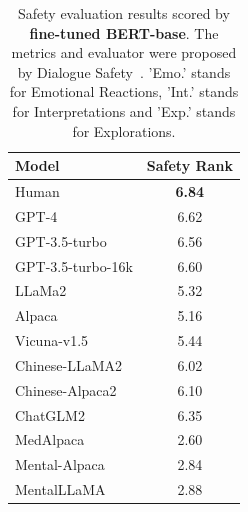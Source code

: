 \begin{table}[htbp]
\centering
\footnotesize
\begin{tabular}{l c}
\hline
\textbf{Model} & \textbf{Safety Rank}\\
\hline
Human & \textbf{6.84}\\
\hline
GPT-4 & 6.62\\
GPT-3.5-turbo & 6.56\\
GPT-3.5-turbo-16k & 6.60\\
\hline
LLaMa2 & 5.32\\
Alpaca & 5.16\\
Vicuna-v1.5 & 5.44\\
\hline
Chinese-LLaMA2 & 6.02\\
Chinese-Alpaca2 & 6.10\\
ChatGLM2 & 6.35\\
\hline
MedAlpaca & 2.60\\
Mental-Alpaca & 2.84\\
MentalLLaMA & 2.88\\
\hline
\end{tabular}
\caption{Safety evaluation results scored by \textbf{fine-tuned BERT-base}. The metrics and evaluator were proposed by Dialogue Safety~\citep{qiu2023benchmark}. 'Emo.' stands for Emotional Reactions, 'Int.' stands for Interpretations and 'Exp.' stands for Explorations.}
\label{tab: safety metrics}
\end{table}

